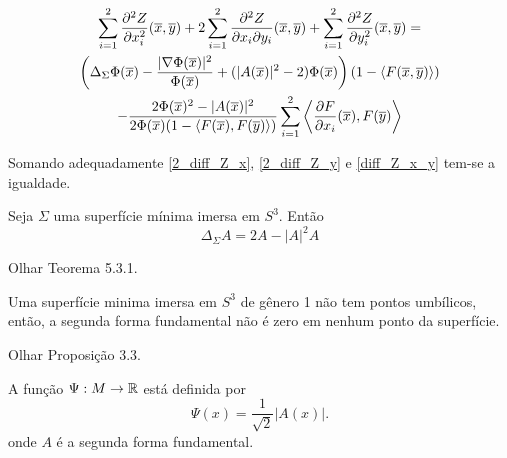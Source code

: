 \begin{proposicao}
	\begin{multline}\label{suma_2das_derivadas}
		\sum_{i=1}^2 \frac{\partial^2 Z}{\partial x_i^2}(\overline{x},\overline{y}) + 2 \sum_{i=1}^2 \frac{\partial^2 Z}{\partial x_i \partial y_i}(\overline{x},\overline{y}) + \sum_{i=1}^2 \frac{\partial^2 Z}{\partial y_i^2}(\overline{x},\overline{y}) =\\
		\left( \Delta_{\Sigma} \Phi(\overline{x}) - \frac{| \nabla \Phi(\overline{x}) |^2}{\Phi(\overline{x})} + ( | A(\overline{x}) |^2 - 2 ) \Phi(\overline{x}) \right) (1 - \langle F(\overline{x},\overline{y}) \rangle)\\
		- \frac{2 \Phi(\overline{x})^2- |A(\overline{x})|^2}{2 \Phi(\overline{x})(1 - \langle F(\overline{x}),F(\overline{y}) \rangle)} \sum_{i=1}^2 \left\langle \frac{\partial F}{\partial x_i}(\overline{x}), F(\overline{y}) \right\rangle
	\end{multline}
\end{proposicao}

\begin{demonstracao}
	Somando adequadamente \eqref{2_diff_Z_x}, \eqref{2_diff_Z_y} e \eqref{diff_Z_x_y} tem-se a igualdade.
\end{demonstracao}

\begin{teorema}\label{Simon's_identity}
	Seja $\Sigma$ uma superfície mínima imersa em $S^3$. Então
	\begin{equation*}
		\Delta_{\Sigma} A = 2 A - |A|^2 A
	\end{equation*} 
\end{teorema}

\begin{demonstracao}
	Olhar \cite{Simons1968} Teorema 5.3.1.
\end{demonstracao}

\begin{teorema}\label{nao_existem_pontos_umbilicos}
	Uma superfície minima imersa em $S^3$ de gênero 1 não tem pontos umbílicos, então, a segunda forma fundamental não é zero em nenhum ponto da superfície.
\end{teorema}

\begin{demonstracao}
	Olhar \cite{Brendle2013} Proposição 3.3.
\end{demonstracao}

\begin{definicao}
	A função $\Psi: M \rightarrow \mathbb{R}$ está definida por
	\begin{equation*}
	\Psi(x) = \frac{1}{\sqrt{2}} |A(x)|.
	\end{equation*}
	onde $A$ é a segunda forma fundamental.
\end{definicao}

